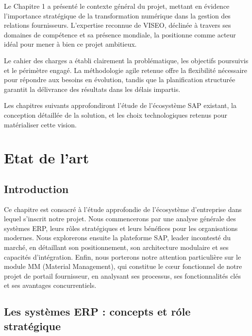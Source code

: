 \documentclass[12pt,a4paper,oneside]{report}
\begin{document}
Le Chapitre 1 a pr\'esent\'e le contexte g\'en\'eral du projet, mettant en \'evidence l'importance stratégique
de la transformation num\'erique dans la gestion des relations fournisseurs. L'expertise reconnue de
VISEO, d\'eclin\'ee \`a travers ses domaines de comp\'etence et sa pr\'esence mondiale, la positionne comme
acteur id\'eal pour mener \`a bien ce projet ambitieux.

Le cahier des charges a \'etabli clairement la probl\'ematique, les objectifs poursuivis et le
p\'erim\`etre engag\'e. La m\'ethodologie agile retenue offre la flexibilit\'e n\'ecessaire pour r\'epondre aux
besoins en \'evolution, tandis que la planification structur\'ee garantit la d\'elivrance des r\'esultats dans
les d\'elais impartis.

Les chapitres suivants approfondiront l'\'etude de l'\'ecosyst\`eme SAP existant, la conception
d\'etaill\'ee de la solution, et les choix technologiques retenus pour mat\'erialiser cette vision.

\chapter{Etat de l’art}\label{ch:existant}

\section{Introduction}\label{ch2:introduction}

Ce chapitre est consacré à l'étude approfondie de l'écosystème d'entreprise dans lequel s'inscrit notre projet.
Nous commencerons par une analyse générale des systèmes ERP, leurs rôles stratégiques et leurs bénéfices pour les organisations modernes.
Nous explorerons ensuite la plateforme SAP, leader incontesté du marché, en détaillant son positionnement, son architecture modulaire et ses capacités d'intégration.
Enfin, nous porterons notre attention particulière sur le module MM (Material Management), qui constitue le cœur fonctionnel de notre projet de portail fournisseur, en analysant ses processus, ses fonctionnalités clés et ses avantages concurrentiels.

\vspace{0.5cm}

\section{Les syst\`emes ERP : concepts et r\'ole strat\'egique}\label{ch2:erp}
\end{document}
